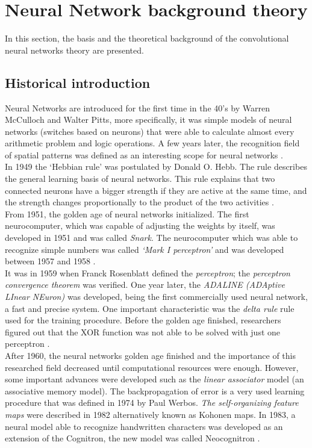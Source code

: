 \section{Neural Network background theory}
In this section, the basis and the theoretical background of the convolutional neural networks theory are presented.\\

\subsection{Historical introduction}
Neural Networks are introduced for the first time in the 40's by Warren McCulloch and Walter Pitts, more specifically, it was simple models of neural networks (switches based on neurons) that were able to calculate almost every arithmetic problem and logic operations. A few years later, the recognition field of spatial patterns was defined as an interesting scope for neural networks \cite{BINN}.\\

In 1949 the `Hebbian rule' was postulated by Donald O. Hebb. The rule describes the general learning basis of neural networks. This rule explains that two connected neurons have  a bigger strength if they are active at the same time, and the strength changes proportionally to the product of the two activities \cite{BINN}.\\

From 1951, the golden age of neural networks initialized. The first neurocomputer, which was capable of adjusting the weights by itself, was developed in 1951 and was called \textit{Snark}. The neurocomputer which was able to recognize simple numbers was called \textit{`Mark I perceptron'} and was developed between 1957 and 1958 \cite{BINN}.\\

It was in 1959 when Franck Rosenblatt defined the \textit{perceptron}; the \textit{perceptron convergence theorem} was verified. One year later, the \textit{ADALINE (ADAptive LInear NEuron)} was developed, being the first commercially used neural network, a fast and precise system. One important characteristic was the \textit{delta rule} rule used for the training procedure. Before the golden age finished, researchers figured out that the XOR function was not able to be solved with just one perceptron \cite{BINN}.\\

After 1960, the neural networks golden age finished and the importance of this researched field decreased until computational resources were enough. However,  some important advances were developed such as the \textit{linear associator} model (an associative memory model). The backpropagation of error is a very used learning procedure that was defined in 1974 by Paul Werbos. \textit{The self-organizing feature maps} were described in 1982 alternatively known as Kohonen maps. In 1983, a neural model able to recognize handwritten characters was developed as an extension of the Cognitron, the new model was called Neocognitron \cite{BINN}.\\

